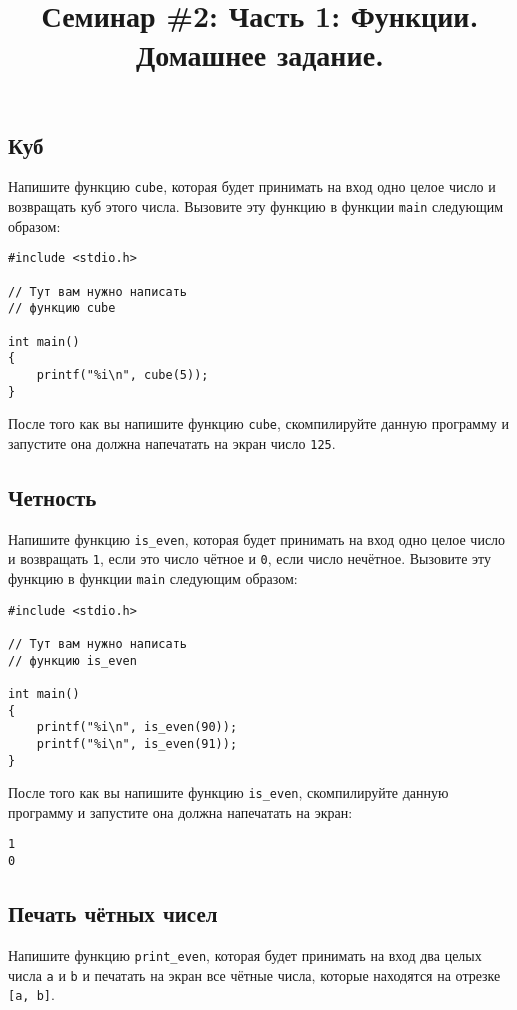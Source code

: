 \documentclass{article}
\begin{document}

\title{Семинар \#2: Часть 1: Функции. Домашнее задание. \vspace{-5ex}}\date{}\maketitle
\subsection{Куб}
Напишите функцию \texttt{cube}, которая будет принимать на вход одно целое число и возвращать куб этого числа. Вызовите эту функцию в функции \texttt{main} следующим образом:
\begin{lstlisting}
#include <stdio.h>

// Тут вам нужно написать
// функцию cube

int main()
{
    printf("%i\n", cube(5));
}
\end{lstlisting}

После того как вы напишите функцию \texttt{cube}, скомпилируйте данную программу и запустите она должна напечатать на экран число \texttt{125}.


\subsection{Четность}
Напишите функцию \texttt{is\_even}, которая будет принимать на вход одно целое число и возвращать \texttt{1}, если это число чётное и \texttt{0}, если число нечётное. Вызовите эту функцию в функции \texttt{main} следующим образом:
\begin{lstlisting}
#include <stdio.h>

// Тут вам нужно написать
// функцию is_even

int main()
{
    printf("%i\n", is_even(90));
    printf("%i\n", is_even(91));
}
\end{lstlisting}
После того как вы напишите функцию \texttt{is\_even}, скомпилируйте данную программу и запустите она должна напечатать на экран:
\begin{verbatim}
1
0
\end{verbatim}

\subsection{Печать чётных чисел}
Напишите функцию \texttt{print\_even}, которая будет принимать на вход два целых числа \texttt{a} и \texttt{b} и печатать на экран все чётные числа, которые находятся на отрезке \texttt{[a, b]}.
\end{document}
